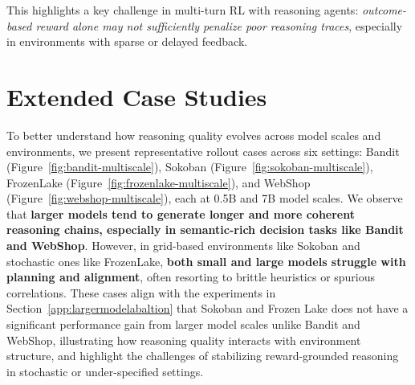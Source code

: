 This highlights a key challenge in multi-turn RL with reasoning agents: \textit{outcome-based reward alone may not sufficiently penalize poor reasoning traces}, especially in environments with sparse or delayed feedback.


\section{Extended Case Studies}

To better understand how reasoning quality evolves across model scales and environments, we present representative rollout cases across six settings: Bandit (Figure~\ref{fig:bandit-multiscale}), Sokoban (Figure~\ref{fig:sokoban-multiscale}), FrozenLake (Figure~\ref{fig:frozenlake-multiscale}), and WebShop (Figure~\ref{fig:webshop-multiscale}), each at 0.5B and 7B model scales. We observe that \textbf{larger models tend to generate longer and more coherent reasoning chains, especially in semantic-rich decision tasks like Bandit and WebShop}. However, in grid-based environments like Sokoban and stochastic ones like FrozenLake, \textbf{both small and large models struggle with planning and alignment}, often resorting to brittle heuristics or spurious correlations. These cases align with the experiments in Section~\ref{app:largermodelabaltion} that Sokoban and Frozen Lake does not have a significant performance gain from larger model scales unlike Bandit and WebShop, illustrating how reasoning quality interacts with environment structure, and highlight the challenges of stabilizing reward-grounded reasoning in stochastic or under-specified settings.

